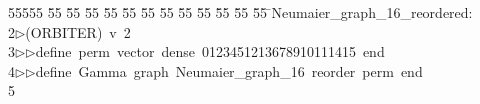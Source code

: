 %
%
\begin{tabbing}
55555 \= 55 \= 55 \= 55 \= 55 \= 55 \= 55 \= 55 \= 55 \= 55 \= 55 \= 55 \= 55 \= \>Neumaier\_graph\_16\_reordered:\\[0pt]
2\>$\triangleright$\>(ORBITER)\ v\ 2\ \\[0pt]
3\>$\triangleright$\>$\triangleright$\>define\ perm\ vector\ dense\ 0123451213678910111415\ end\ \\[0pt]
4\>$\triangleright$\>$\triangleright$\>define\ Gamma\ graph\ Neumaier\_graph\_16\ reorder\ perm\ end\ \\[0pt]
5\>\end{tabbing}
